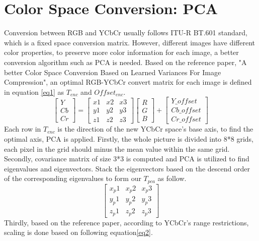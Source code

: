 \documentclass[twocolumn]{article}  %
\begin{document}
\section{Color Space Conversion: PCA }
Conversion between RGB and YCbCr usually follows ITU-R BT.601 standard, which is a fixed space conversion matrix. However, different images have different color properties, to preserve more color information for each image, a better conversion algorithm such as PCA is needed.
Based on the reference paper, "A better Color Space Conversion Based on Learned Variances For Image Compression\cite{PCA}", an optimal RGB-YCbCr convert matrix for each image is defined in equation \eqref{eq1} as $T_{enc}$ and $Offset_{enc}$.
\begin{equation}
\left[
\begin{array}{ccc}
Y \\
Cb\\
Cr
\end{array}
\right]=
\left[
\begin{array}{ccc}
x1 & x2 & x3   \\
y1 & y2 & y3   \\
z1 & z2 & z3
\end{array}
\right]
\left[
\begin{array}{ccc}
R  \\
G  \\
B
\end{array}
\right]
+
\left[
\begin{array}{ccc}
Y\_offset \\
Cb\_offset \\
Cr\_offset
\end{array}
\right]\label{eq1}
\end{equation}
Each row in $T_{enc}$ is the direction of the new YCbCr space's base axis, to find the optimal axis, PCA is applied. Firstly, the whole picture is divided into 8*8 grids, each pixel in the grid should minus the mean value within the same grid. Secondly, covariance matrix of size 3*3 is computed and PCA is utilized to find eigenvalues and eigenvectors. Stack the eigenvectors based on the descend order of the corresponding eigenvalues to form our $T_{pca}$ as follow. 
$$
\left[
\begin{array}{ccc}
x_{p}1 & x_{p}2 & x_{p}3   \\
y_{p}1 & y_{p}2 & y_{p}3   \\
z_{p}1 & z_{p}2 & z_{p}3
\end{array}
\right]
$$
Thirdly, based on the reference paper, according to YCbCr's range restrictions, scaling is done based on following equation\eqref{eq2}.
\end{document}
